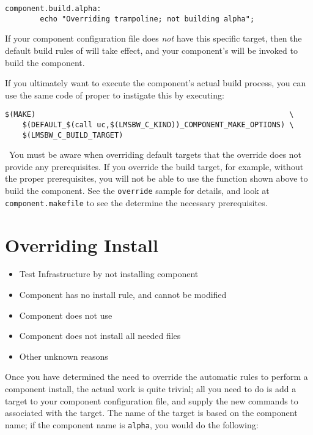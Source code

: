 \begin{verbatim}
component.build.alpha:
        echo "Overriding trampoline; not building alpha";
\end{verbatim}

If your component configuration file does \emph{not} have this
specific target, then the default build rules of \lmsbw will take
effect, and your component's \makefile will be invoked to build the
component.

If you ultimately want to execute the component's actual build
process, you can use the same code of \lmsbw proper to instigate this
by executing:

\begin{footnotesize}
\begin{verbatim}
$(MAKE)                                                          \
    $(DEFAULT_$(call uc,$(LMSBW_C_KIND))_COMPONENT_MAKE_OPTIONS) \
    $(LMSBW_C_BUILD_TARGET)
\end{verbatim}
\end{footnotesize}
\
You must be aware when overriding default targets that the override
does not provide any prerequisites.  If you override the build target,
for example, without the proper prerequisites, you will not be able to
use the function shown above to build the component.  See the
\texttt{override} sample for details, and look at
\texttt{component.makefile} to see the determine the necessary
prerequisites.

\section{Overriding Install}\label{overriding:overriding-install}

\begin{itemize}
\item Test \bni Infrastructure by not installing component
\item Component \makefile has no install rule, and cannot be modified
\item Component \makefile does not use \destdir
\item Component does not install all needed files
\item Other unknown reasons
\end{itemize}


Once you have determined the need to override the automatic rules to
perform a component install, the actual work is quite trivial; all you
need to do is add a \makefile target to your component configuration
file, and supply the new commands to associated with the target.  The
name of the target is based on the component name; if the component
name is \texttt{alpha}, you would do the following:


